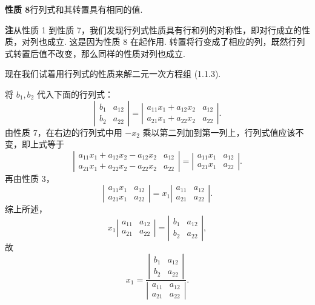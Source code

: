 \documentclass[UTF8, 12pt, fontset=fandol, oneside]{ctexart}
\begin{document}
\noindent\textbf{性质 8}\quad 行列式和其转置具有相同的值.

\noindent\textbf{注}\quad 从性质 1 到性质 7，我们发现行列式性质具有行和列的对称性，即对行成立的性质，对列也成立. 这是因为性质 8 在起作用. 转置将行变成了相应的列，既然行列式转置后值不改变，那么同样的性质对列也成立.

现在我们试着用行列式的性质来解二元一次方程组 (1.1.3).

将 $b_1,b_2$ 代入下面的行列式：
\[
\left|\begin{array}{cc}
b_1 & a_{12}\\
b_2 & a_{22}
\end{array}\right|
=
\left|\begin{array}{cc}
a_{11}x_1+a_{12}x_2 & a_{12}\\
a_{21}x_1+a_{22}x_2 & a_{22}
\end{array}\right|.
\]
由性质 7，在右边的行列式中用 $-x_2$ 乘以第二列加到第一列上，行列式值应该不变，即上式等于
\[
\left|\begin{array}{cc}
a_{11}x_1+a_{12}x_2-a_{12}x_2 & a_{12}\\
a_{21}x_1+a_{22}x_2-a_{22}x_2 & a_{22}
\end{array}\right|
=
\left|\begin{array}{cc}
a_{11}x_1 & a_{12}\\
a_{21}x_1 & a_{22}
\end{array}\right|.
\]
再由性质 3，
\[
\left|\begin{array}{cc}
a_{11}x_1 & a_{12}\\
a_{21}x_1 & a_{22}
\end{array}\right|
=x_1
\left|\begin{array}{cc}
a_{11} & a_{12}\\
a_{21} & a_{22}
\end{array}\right|.
\]
综上所述，
\[
x_1
\left|\begin{array}{cc}
a_{11} & a_{12}\\
a_{21} & a_{22}
\end{array}\right|
=
\left|\begin{array}{cc}
b_1 & a_{12}\\
b_2 & a_{22}
\end{array}\right|,
\]
故
\[
x_1=
\frac{
\left|\begin{array}{cc}
b_1 & a_{12}\\
b_2 & a_{22}
\end{array}\right|}
{\left|\begin{array}{cc}
a_{11} & a_{12}\\
a_{21} & a_{22}
\end{array}\right|}.
\]
\end{document}
